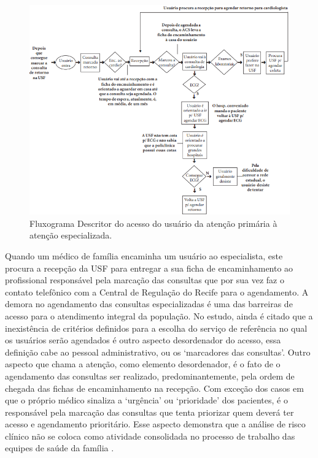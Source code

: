      \begin{figure}[htbp]
        	\centering
            \caption{Fluxograma Descritor do acesso do usuário da atenção primária à atenção especializada.}
            \label{fig:images/fluxograma-trajetoria-usf-pe}
            \includegraphics[width=0.8\linewidth]{images/fluxograma-trajetoria-usf-pe}
        \end{figure}
        
    Quando um médico de família encaminha um usuário ao especialista, este procura a recepção da USF para entregar a sua ficha de encaminhamento ao profissional responsável pela marcação das consultas que por sua vez faz o contato telefônico com a Central de Regulação do Recife para o agendamento.
    A demora no agendamento das consultas especializadas é uma das barreiras de acesso para o atendimento integral da população. No estudo, ainda é citado que a inexistência de critérios definidos para a escolha do serviço de referência no qual os usuários serão agendados é outro aspecto desordenador do acesso, essa definição cabe ao pessoal administrativo, ou os ‘marcadores das consultas’. Outro aspecto que chama a atenção, como
    elemento desordenador, é o fato de o agendamento das consultas ser realizado, predominantemente, pela ordem de chegada das fichas de encaminhamento na recepção. Com exceção dos casos em que o próprio médico sinaliza a ‘urgência’ ou ‘prioridade’ dos pacientes, é o responsável pela marcação das consultas que tenta priorizar
    quem deverá ter acesso e agendamento prioritário. Esse aspecto demonstra que a análise de risco clínico não se coloca como atividade consolidada no processo de trabalho das equipes de saúde da família .
    
